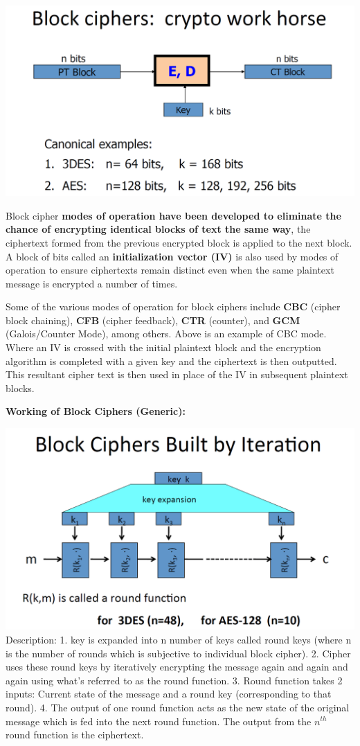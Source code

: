 \documentclass[11pt]{article}
\makeatletter
\def\maxwidth{\ifdim\Gin@nat@width>\linewidth\linewidth
    \else\Gin@nat@width\fi}
\let\Oldincludegraphics\includegraphics
\renewcommand{\includegraphics}[1]{\Oldincludegraphics[width=.8\maxwidth]{#1}}
\makeatother
\begin{document}
\includegraphics{./Images/BlockCiphers.png}

Block cipher \textbf{modes of operation have been developed to eliminate
the chance of encrypting identical blocks of text the same way}, the
ciphertext formed from the previous encrypted block is applied to the
next block. A block of bits called an \textbf{initialization vector
(IV)} is also used by modes of operation to ensure ciphertexts remain
distinct even when the same plaintext message is encrypted a number of
times.

Some of the various modes of operation for block ciphers include
\textbf{CBC} (cipher block chaining), \textbf{CFB} (cipher feedback),
\textbf{CTR} (counter), and \textbf{GCM} (Galois/Counter Mode), among
others. Above is an example of CBC mode. Where an IV is crossed with the
initial plaintext block and the encryption algorithm is completed with a
given key and the ciphertext is then outputted. This resultant cipher
text is then used in place of the IV in subsequent plaintext blocks.

\textbf{Working of Block Ciphers (Generic):}

\includegraphics{./Images/BlockCipher-Working.png} Description: 1. key
is expanded into n number of keys called round keys (where n is the
number of rounds which is subjective to individual block cipher). 2.
Cipher uses these round keys by iteratively encrypting the message again
and again and again using what's referred to as the round function. 3.
Round function takes 2 inputs: Current state of the message and a round
key (corresponding to that round). 4. The output of one round function
acts as the new state of the original message which is fed into the next
round function. The output from the \(n^{th}\) round function is the
ciphertext.
\end{document}
